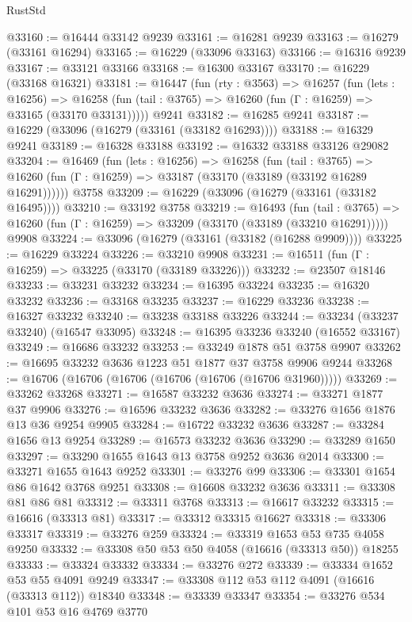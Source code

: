 \begin{lexlean}{RustStd}
\begin{coremodule}
@33160 := @16444 @33142 @9239
@33161 := @16281 @9239
@33163 := @16279 (@33161 @16294)
@33165 := @16229 (@33096 @33163)
@33166 := @16316 @9239
@33167 := @33121 @33166
@33168 := @16300 @33167
@33170 := @16229 (@33168 @16321)
@33181 := @16447
    (fun (rty : @3563) =>
    @16257
      (fun (lets : @16256) =>
      @16258 (fun (tail : @3765) => @16260 (fun (Γ : @16259) => @33165 (@33170 @33131)))))
    @9241
@33182 := @16285 @9241
@33187 := @16229 (@33096 (@16279 (@33161 (@33182 @16293))))
@33188 := @16329 @9241
@33189 := @16328 @33188
@33192 := @16332 @33188 @33126 @29082
@33204 := @16469
    (fun (lets : @16256) =>
    @16258
      (fun (tail : @3765) =>
      @16260 (fun (Γ : @16259) => @33187 (@33170 (@33189 (@33192 @16289 @16291))))))
    @3758
@33209 := @16229 (@33096 (@16279 (@33161 (@33182 @16495))))
@33210 := @33192 @3758
@33219 := @16493
    (fun (tail : @3765) => @16260 (fun (Γ : @16259) => @33209 (@33170 (@33189 (@33210 @16291)))))
    @9908
@33224 := @33096 (@16279 (@33161 (@33182 (@16288 @9909))))
@33225 := @16229 @33224
@33226 := @33210 @9908
@33231 := @16511 (fun (Γ : @16259) => @33225 (@33170 (@33189 @33226)))
@33232 := @23507 @18146
@33233 := @33231 @33232
@33234 := @16395 @33224
@33235 := @16320 @33232
@33236 := @33168 @33235
@33237 := @16229 @33236
@33238 := @16327 @33232
@33240 := @33238 @33188 @33226
@33244 := @33234 (@33237 @33240) (@16547 @33095)
@33248 := @16395 @33236 @33240 (@16552 @33167)
@33249 := @16686 @33232
@33253 := @33249 @1878 @51 @3758 @9907
@33262 := @16695 @33232 @3636 @1223 @51 @1877 @37 @3758 @9906 @9244
@33268 := @16706 (@16706 (@16706 (@16706 (@16706 (@16706 @31960)))))
@33269 := @33262 @33268
@33271 := @16587 @33232 @3636
@33274 := @33271 @1877 @37 @9906
@33276 := @16596 @33232 @3636
@33282 := @33276 @1656 @1876 @13 @36 @9254 @9905
@33284 := @16722 @33232 @3636
@33287 := @33284 @1656 @13 @9254
@33289 := @16573 @33232 @3636
@33290 := @33289 @1650
@33297 := @33290 @1655 @1643 @13 @3758 @9252 @3636 @2014
@33300 := @33271 @1655 @1643 @9252
@33301 := @33276 @99
@33306 := @33301 @1654 @86 @1642 @3768 @9251
@33308 := @16608 @33232 @3636
@33311 := @33308 @81 @86 @81
@33312 := @33311 @3768
@33313 := @16617 @33232
@33315 := @16616 (@33313 @81)
@33317 := @33312 @33315 @16627
@33318 := @33306 @33317
@33319 := @33276 @259
@33324 := @33319 @1653 @53 @735 @4058 @9250
@33332 := @33308 @50 @53 @50 @4058 (@16616 (@33313 @50)) @18255
@33333 := @33324 @33332
@33334 := @33276 @272
@33339 := @33334 @1652 @53 @55 @4091 @9249
@33347 := @33308 @112 @53 @112 @4091 (@16616 (@33313 @112)) @18340
@33348 := @33339 @33347
@33354 := @33276 @534 @101 @53 @16 @4769 @3770

\end{coremodule}
\end{lexlean}
